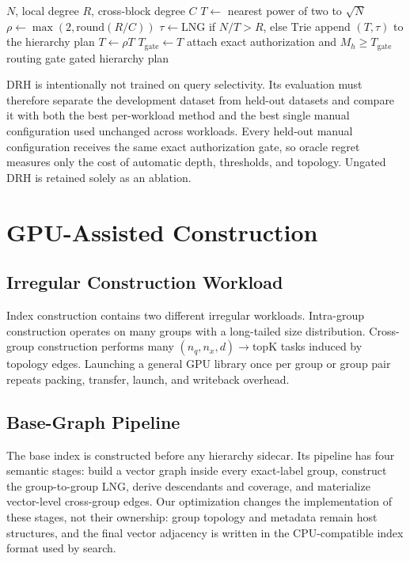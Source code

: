 \documentclass[sigconf,review,anonymous]{acmart}
\begin{document}
\begin{algorithm}[t]
\caption{Gated Degree-Ratio Hierarchy (DRH)}
\label{alg:drh}
\begin{algorithmic}[1]
\Require $N$, local degree $R$, cross-block degree $C$
\State $T\gets$ nearest power of two to $\sqrt{N}$
\State $\rho\gets\max(2,\mathrm{round}(R/C))$
  \State $\tau\gets\mathrm{LNG}$ if $N/T>R$, else $\mathrm{Trie}$
  \State append $(T,\tau)$ to the hierarchy plan
  \State $T\gets\rho T$
\EndWhile
\State $T_{\mathrm{gate}}\gets T$ 
\State attach exact authorization and $M_h\ge T_{\mathrm{gate}}$ routing gate
\State \Return gated hierarchy plan
\end{algorithmic}
\end{algorithm}

DRH is intentionally not trained on query selectivity. Its evaluation must
therefore separate the development dataset from held-out datasets and compare
it with both the best per-workload method and the best single manual
configuration used unchanged across workloads. Every held-out manual
configuration receives the same exact authorization gate, so oracle regret
measures only the cost of automatic depth, thresholds, and topology. Ungated
DRH is retained solely as an ablation.

\section{GPU-Assisted Construction}
\subsection{Irregular Construction Workload}
Index construction contains two different irregular workloads.  Intra-group
construction operates on many groups with a long-tailed size distribution.
Cross-group construction performs many $(n_q,n_x,d)\rightarrow\mathrm{topK}$
tasks induced by topology edges.  Launching a general GPU library once per
group or group pair repeats packing, transfer, launch, and writeback overhead.

\subsection{Base-Graph Pipeline}
The base index is constructed before any hierarchy sidecar.  Its pipeline has
four semantic stages: build a vector graph inside every exact-label group,
construct the group-to-group LNG, derive descendants and coverage, and
materialize vector-level cross-group edges.  Our optimization changes the
implementation of these stages, not their ownership: group topology and
metadata remain host structures, and the final vector adjacency is written in
the CPU-compatible index format used by search.
\end{document}
